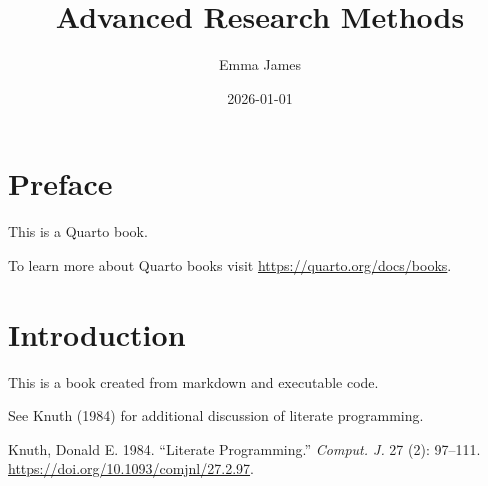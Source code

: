 \documentclass[
  letterpaper,
  DIV=11,
  numbers=noendperiod]{scrreprt}
\title{Advanced Research Methods}
\author{Emma James}
\date{2026-01-01}
\newlength{\cslhangindent}
\newenvironment{CSLReferences}[2] %
 {\begin{list}{}{%
  \setlength{\itemindent}{0pt}
  \setlength{\leftmargin}{0pt}
  \setlength{\parsep}{0pt}
  \ifodd #1
   \setlength{\leftmargin}{\cslhangindent}
   \setlength{\itemindent}{-1\cslhangindent}
  \fi
  \setlength{\itemsep}{#2\baselineskip}}}
 {\end{list}}
\renewcommand*\contentsname{Table of contents}
\newcommand\contentsname{Table of contents}
\begin{document}
\maketitle

\renewcommand*\contentsname{Table of contents}
{
\hypersetup{linkcolor=}
\setcounter{tocdepth}{2}
\tableofcontents
}


\chapter*{Preface}\label{preface}


This is a Quarto book.

To learn more about Quarto books visit
\url{https://quarto.org/docs/books}.


\chapter{Introduction}\label{introduction}

This is a book created from markdown and executable code.

See Knuth (1984) for additional discussion of literate programming.

\label{refs}
\begin{CSLReferences}{1}{0}
Knuth, Donald E. 1984. {``Literate Programming.''} \emph{Comput. J.} 27
(2): 97--111. \url{https://doi.org/10.1093/comjnl/27.2.97}.

\end{CSLReferences}
\end{document}
